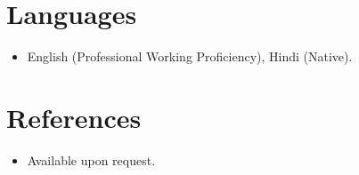 \documentclass[11pt,a4paper,sans]{moderncv}
\begin{document}
\section{Languages}
\vspace{1pt}
\begin{itemize}
\item{English (Professional Working Proficiency), Hindi (Native).}
\end{itemize}


\section{References}
\vspace{1pt}
\begin{itemize}
\item{Available upon request.}
\end{itemize}
\end{document}
